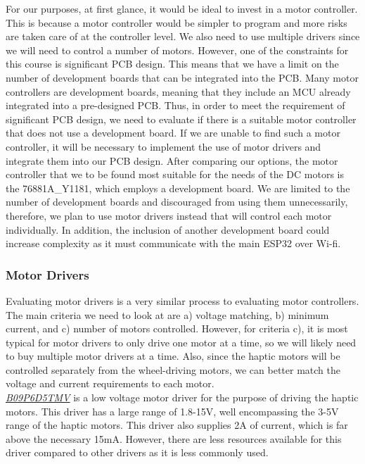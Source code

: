 \noindent  For our purposes, at first glance, it would be ideal to invest in a motor controller. This is because a motor controller would be simpler to program and more risks are taken care of at the controller level. We also need to use multiple drivers since we will need to control a number of motors. However, one of the constraints for this course is significant PCB design. This means that we have a limit on the number of development boards that can be integrated into the PCB. Many motor controllers are development boards, meaning that they include an MCU already integrated into a pre-designed PCB. Thus, in order to meet the requirement of significant PCB design, we need to evaluate if there is a suitable motor controller that does not use a development board. If we are unable to find such a motor controller, it will be necessary to implement the use of motor drivers and integrate them into our PCB design. After comparing our options, the motor controller that we to be found most suitable for the needs of the DC motors is the 76881A\_Y1181, which employs a development board. We are limited to the number of development boards and discouraged from using them unnecessarily, therefore, we plan to use motor drivers instead that will control each motor individually. In addition, the inclusion of another development board could increase complexity as it must communicate with the main ESP32 over Wi-fi.\\

\subsubsection{Motor Drivers}
\noindent Evaluating motor drivers is a very similar process to evaluating motor controllers. The main criteria we need to look at are a) voltage matching, b) minimum current, and c) number of motors controlled. However, for criteria c), it is most typical for motor drivers to only drive one motor at a time, so we will likely need to buy multiple motor drivers at a time. Also, since the haptic motors will be controlled separately from the wheel-driving motors, we can better match the voltage and current requirements to each motor.\\

\noindent \underline{\textit{B09P6D5TMV}} is a low voltage motor driver for the purpose of driving the haptic motors. This driver has a large range of 1.8-15V, well encompassing the 3-5V range of the haptic motors. This driver also supplies 2A of current, which is far above the necessary 15mA. However, there are less resources available for this driver compared to other drivers as it is less commonly used.\\

